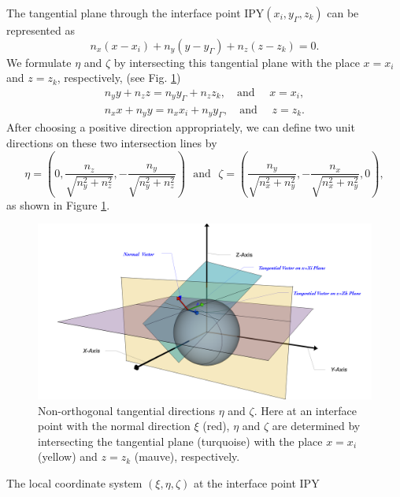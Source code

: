 \documentclass[dissertation]{uathesis}
\begin{document}
\begin{body}
\begin{flushleft}
\hspace{1cm} The tangential plane through the interface point IPY$(x_{i},y_{\Gamma},z_{k})$ can be represented as  
%
\begin{equation} \label{tangential_plane}
n_{x}(x-x_{i}) + n_{y}(y-y_{\Gamma}) + n_{z}(z-z_{k}) = 0.
\end{equation}
%
We formulate $\eta$ and $\zeta$ by intersecting this tangential plane with the place $x=x_i$ and $z=z_k$, respectively, (see Fig. \ref{fig:local_coordinate})
%
\begin{align}\label{Intersecting lines}
n_{y}y + n_{z}z = n_{y}y_{\Gamma} + n_{z}z_{k}, \quad \mbox{and } \quad x = x_i, \\
n_{x}x + n_{y}y = n_{x}x_{i} + n_{y}y_{\Gamma}, \quad \mbox{and } \quad z = z_k.
\end{align}
%
After choosing a positive direction appropriately, we can define two unit directions on these two intersection lines by 
%
$$\eta = (0, \frac{n_{z}}{\sqrt{n^{2}_{y}+n^{2}_{z}}}, -\frac{n_{y}}{\sqrt{n^{2}_{y}+n^{2}_{z}}}) ~~~ \mbox{and} ~~~ \zeta = ( \frac{n_{y}}{\sqrt{n^{2}_{x}+n^{2}_{y}}}, -\frac{n_{x}}{\sqrt{n^{2}_{x}+n^{2}_{y}}}, 0 ),$$
%
as shown in Figure \ref{fig:local_coordinate}.
%
\begin{figure}[!tb] 
	\begin{center}
		\includegraphics[width=17cm]{../figures/Local-Coordinate.png}
	\end{center}
	\caption{Non-orthogonal tangential directions $\eta$ and $\zeta$. Here at an interface point with
		the normal direction $\xi$ (red), $\eta$ and $\zeta$ are determined by intersecting the tangential plane (turquoise) with the place $x=x_i$ (yellow) and $z=z_k$ (mauve), respectively. 	
	}
	\label{fig:local_coordinate}
\end{figure}
%
The local coordinate system $(\xi,\eta,\zeta)$ at the interface point IPY

\end{flushleft}
\end{body}
\end{document}
